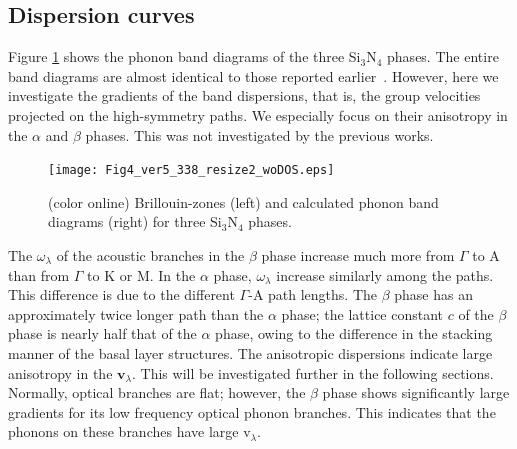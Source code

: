 \documentclass[twocolumn,amsmath,amssymb,a4paper,prb,superscriptaddress,floatfix]{revtex4-1}
\begin{document}
\subsection{Dispersion curves}

Figure \ref{fig:Fig4_ver5_338} shows the phonon band diagrams of the three
Si$_3$N$_4$ phases. The entire band diagrams are almost identical to those
reported earlier~\cite{kuwabara,xu}. However, here we investigate the gradients
of the band dispersions, that is, the group
velocities projected on the high-symmetry paths. We especially focus on their
anisotropy in the $\alpha$ and $\beta$ phases. This was
not investigated by the previous works.

\begin{figure}[ht]
 \begin{center}
  \texttt{[image: Fig4\_ver5\_338\_resize2\_woDOS.eps]}
  \caption{(color online) Brillouin-zones (left) and calculated phonon band diagrams (right) for three Si$_3$N$_4$ phases.
  \label{fig:Fig4_ver5_338} }
 \end{center}
\end{figure}

The $\omega_{\lambda}$ of the acoustic branches in the $\beta$ phase increase
much more from $\Gamma$ to A than from $\Gamma$ to K or M.  In the $\alpha$
phase, $\omega_{\lambda}$ increase similarly among the paths.
This difference is due to the different $\Gamma$-A path lengths.  The
$\beta$ phase has an approximately twice longer path than the $\alpha$ phase;
the lattice constant $c$ of the $\beta$ phase is nearly half that of the
$\alpha$ phase, owing to the difference in the stacking manner of the basal
layer structures. The anisotropic dispersions indicate large anisotropy in the
$\mathbf{v}_\lambda$. This will be investigated further in the following
sections.
Normally, optical branches are flat;
however, the $\beta$ phase shows significantly large gradients for its low
frequency optical phonon branches. This indicates that the phonons on these
branches have large \rm{v}$_{\lambda}$.
\end{document}
